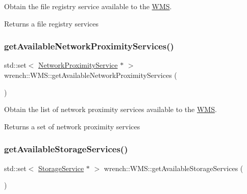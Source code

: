 Obtain the file registry service available to the \hyperlink{classwrench_1_1_w_m_s}{W\+MS}. 

\begin{DoxyReturn}{Returns}
a file registry services 
\end{DoxyReturn}
\mbox{\label{classwrench_1_1_w_m_s_a41bb62da83533e5d87089187ba23d079}} 
\subsubsection{\texorpdfstring{get\+Available\+Network\+Proximity\+Services()}{getAvailableNetworkProximityServices()}}
{\footnotesize\ttfamily std\+::set$<$ \hyperlink{classwrench_1_1_network_proximity_service}{Network\+Proximity\+Service} $\ast$ $>$ wrench\+::\+W\+M\+S\+::get\+Available\+Network\+Proximity\+Services (\begin{DoxyParamCaption}{ }\end{DoxyParamCaption})\hspace{0.3cm}{\ttfamily [protected]}}



Obtain the list of network proximity services available to the \hyperlink{classwrench_1_1_w_m_s}{W\+MS}. 

\begin{DoxyReturn}{Returns}
a set of network proximity services 
\end{DoxyReturn}
\mbox{\label{classwrench_1_1_w_m_s_aa5a5f673888e1a455ef9fbaff531cb0c}} 
\subsubsection{\texorpdfstring{get\+Available\+Storage\+Services()}{getAvailableStorageServices()}}
{\footnotesize\ttfamily std\+::set$<$ \hyperlink{classwrench_1_1_storage_service}{Storage\+Service} $\ast$ $>$ wrench\+::\+W\+M\+S\+::get\+Available\+Storage\+Services (\begin{DoxyParamCaption}{ }\end{DoxyParamCaption})\hspace{0.3cm}{\ttfamily [protected]}}



